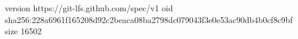 version https://git-lfs.github.com/spec/v1
oid sha256:228a6961f165208d92c2beaca08ba2798dc079043f3e0e53ac90db4b0cf8c9bf
size 16502
